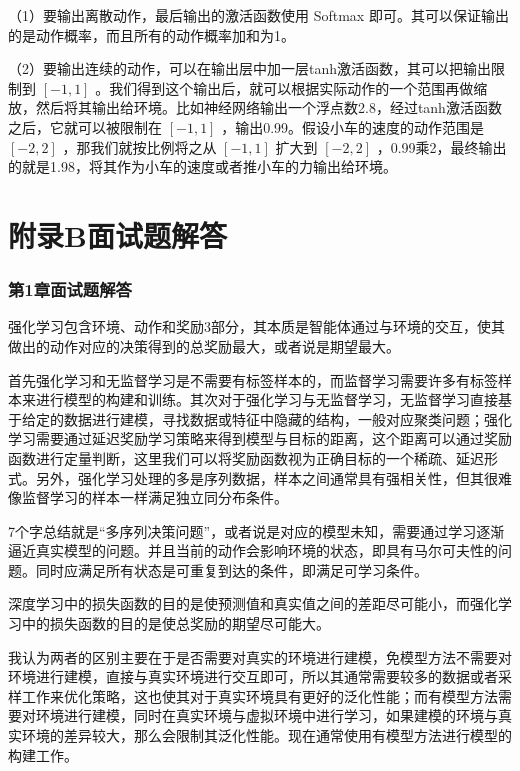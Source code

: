 （1）要输出离散动作，最后输出的激活函数使用 Softmax 即可。其可以保证输出的是动作概率，而且所有的动作概率加和为1。

（2）要输出连续的动作，可以在输出层中加一层tanh激活函数，其可以把输出限制到 $[-1,1]$ 。我们得到这个输出后，就可以根据实际动作的一个范围再做缩放，然后将其输出给环境。比如神经网络输出一个浮点数2.8，经过tanh激活函数之后，它就可以被限制在 $[-1,1]$ ，输出0.99。假设小车的速度的动作范围是 $[-2,2]$ ，那我们就按比例将之从 $[-1,1]$ 扩大到 $[-2,2]$ ，0.99乘2，最终输出的就是1.98，将其作为小车的速度或者推小车的力输出给环境。





\section{附录B面试题解答}

\subsubsection*{第1章面试题解答}

    
强化学习包含环境、动作和奖励3部分，其本质是智能体通过与环境的交互，使其做出的动作对应的决策得到的总奖励最大，或者说是期望最大。

    
首先强化学习和无监督学习是不需要有标签样本的，而监督学习需要许多有标签样本来进行模型的构建和训练。其次对于强化学习与无监督学习，无监督学习直接基于给定的数据进行建模，寻找数据或特征中隐藏的结构，一般对应聚类问题；强化学习需要通过延迟奖励学习策略来得到模型与目标的距离，这个距离可以通过奖励函数进行定量判断，这里我们可以将奖励函数视为正确目标的一个稀疏、延迟形式。另外，强化学习处理的多是序列数据，样本之间通常具有强相关性，但其很难像监督学习的样本一样满足独立同分布条件。

    
7个字总结就是“多序列决策问题”，或者说是对应的模型未知，需要通过学习逐渐逼近真实模型的问题。并且当前的动作会影响环境的状态，即具有马尔可夫性的问题。同时应满足所有状态是可重复到达的条件，即满足可学习条件。

    
深度学习中的损失函数的目的是使预测值和真实值之间的差距尽可能小，而强化学习中的损失函数的目的是使总奖励的期望尽可能大。

    
我认为两者的区别主要在于是否需要对真实的环境进行建模，免模型方法不需要对环境进行建模，直接与真实环境进行交互即可，所以其通常需要较多的数据或者采样工作来优化策略，这也使其对于真实环境具有更好的泛化性能；而有模型方法需要对环境进行建模，同时在真实环境与虚拟环境中进行学习，如果建模的环境与真实环境的差异较大，那么会限制其泛化性能。现在通常使用有模型方法进行模型的构建工作。



